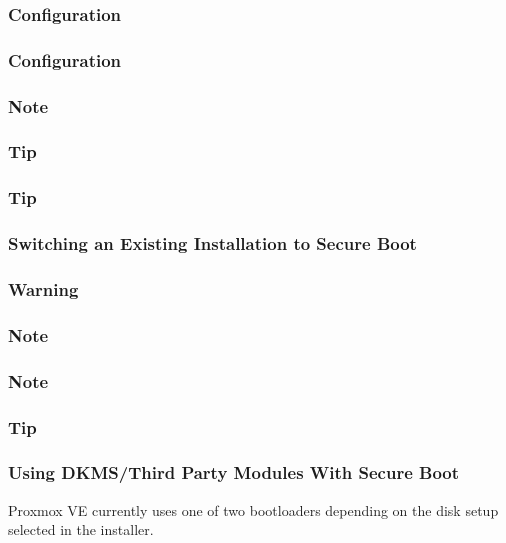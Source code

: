 \subsubsection{Configuration}

\subsubsection{Configuration}

\subsubsection{Note}

\subsubsection{Tip}

\subsubsection{Tip}

\subsubsection{Switching an Existing Installation to Secure Boot}

\subsubsection{Warning}

\subsubsection{Note}

\subsubsection{Note}

\subsubsection{Tip}

\subsubsection{Using DKMS/Third Party Modules With Secure Boot}

Proxmox VE currently uses one of two bootloaders depending on the disk setup selected in the installer.

